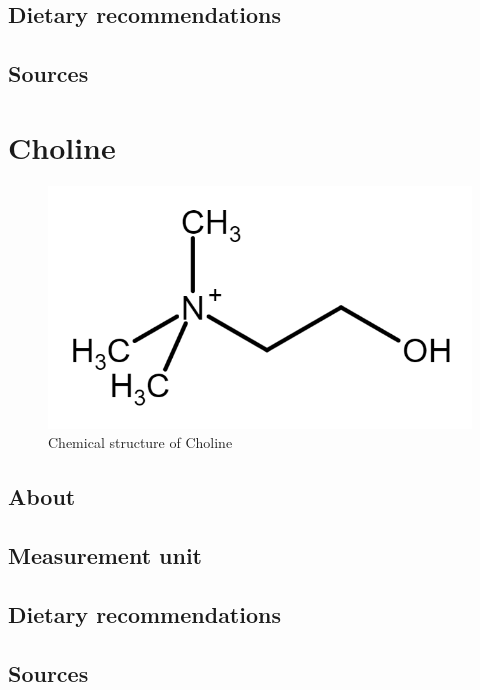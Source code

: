 \documentclass{book}
\begin{document}
\section{Dietary recommendations}


\section{Sources}


\chapter{Choline}
\begin{figure}[h]
	\centering \includegraphics[width=0.75\linewidth]{images/Choline_chemical_structure}
	\caption{Chemical structure of Choline}
\end{figure}

\section{About}


\section{Measurement unit}


\section{Dietary recommendations}


\section{Sources}


\listoffigures
\listoftables
\end{document}
